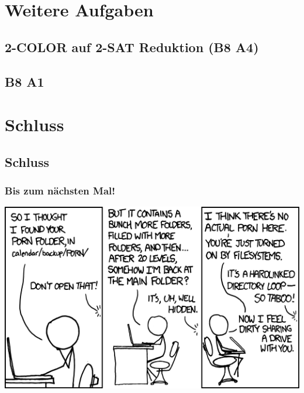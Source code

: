 \section{Weitere Aufgaben}
\subsection{2-COLOR auf 2-SAT Reduktion (B8 A4)}
\subsection{B8 A1}

\section{Schluss}
\subsection{Schluss}
\begin{frame}
\frametitle{Bis zum nächsten Mal!}
\begin{center}
	\includegraphics[width=1 \textheight]{images/xkcd_981.png}
\end{center}
\end{frame}

